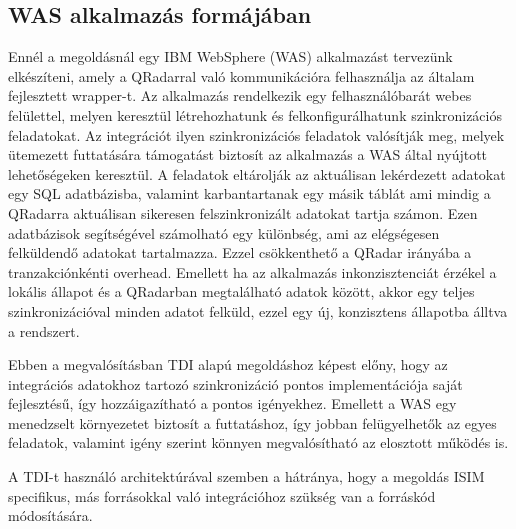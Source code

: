 \subsection{WAS alkalmazás formájában}

Ennél a megoldásnál egy IBM WebSphere (WAS) alkalmazást tervezünk elkészíteni, amely a QRadarral való kommunikációra felhasználja az általam fejlesztett wrapper-t. Az alkalmazás rendelkezik egy felhasználóbarát webes felülettel, melyen keresztül létrehozhatunk és felkonfigurálhatunk szinkronizációs feladatokat. Az integrációt ilyen szinkronizációs feladatok valósítják meg, melyek ütemezett futtatására támogatást biztosít az alkalmazás a WAS által nyújtott lehetőségeken keresztül. A feladatok eltárolják az aktuálisan lekérdezett adatokat egy SQL adatbázisba, valamint karbantartanak egy másik táblát ami mindig a QRadarra aktuálisan sikeresen felszinkronizált adatokat tartja számon. Ezen adatbázisok segítségével számolható egy különbség, ami az elégségesen felküldendő adatokat tartalmazza. Ezzel csökkenthető a QRadar irányába a tranzakciónkénti overhead. Emellett ha az alkalmazás inkonzisztenciát érzékel a lokális állapot és a QRadarban megtalálható adatok között, akkor egy teljes szinkronizációval minden adatot felküld, ezzel egy új, konzisztens állapotba álltva a rendszert.

Ebben a megvalósításban TDI alapú megoldáshoz képest előny, hogy az integrációs adatokhoz tartozó szinkronizáció pontos implementációja saját fejlesztésű, így hozzáigazítható a pontos igényekhez. Emellett a WAS egy menedzselt környezetet biztosít a futtatáshoz, így jobban felügyelhetők az egyes feladatok, valamint igény szerint könnyen megvalósítható az elosztott működés is.

A TDI-t használó architektúrával szemben a hátránya, hogy a megoldás ISIM specifikus, más forrásokkal való integrációhoz szükség van a forráskód módosítására.




